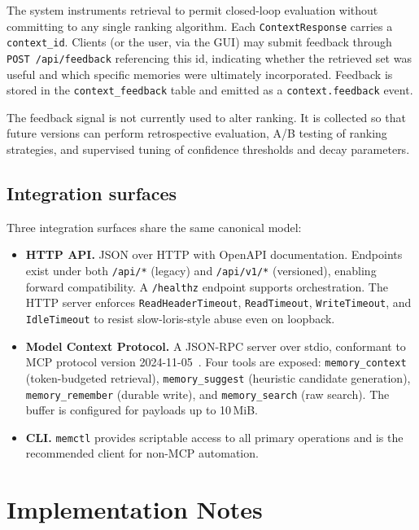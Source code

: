 \documentclass[11pt,a4paper]{article}
\begin{document}
The system instruments retrieval to permit closed-loop evaluation without committing to any single ranking algorithm. Each \texttt{ContextResponse} carries a \texttt{context\_id}. Clients (or the user, via the GUI) may submit feedback through \texttt{POST /api/feedback} referencing this id, indicating whether the retrieved set was useful and which specific memories were ultimately incorporated. Feedback is stored in the \texttt{context\_feedback} table and emitted as a \texttt{context.feedback} event.

The feedback signal is not currently used to alter ranking. It is collected so that future versions can perform retrospective evaluation, A/B testing of ranking strategies, and supervised tuning of confidence thresholds and decay parameters.

\subsection{Integration surfaces}

Three integration surfaces share the same canonical model:

\begin{itemize}
 \item \textbf{HTTP API.} JSON over HTTP with OpenAPI documentation. Endpoints exist under both \texttt{/api/*} (legacy) and \texttt{/api/v1/*} (versioned), enabling forward compatibility. A \texttt{/healthz} endpoint supports orchestration. The HTTP server enforces \texttt{ReadHeaderTimeout}, \texttt{ReadTimeout}, \texttt{WriteTimeout}, and \texttt{IdleTimeout} to resist slow-loris-style abuse even on loopback.
 \item \textbf{Model Context Protocol.} A JSON-RPC server over stdio, conformant to MCP protocol version 2024-11-05~\cite{mcpspec}. Four tools are exposed: \texttt{memory\_context} (token-budgeted retrieval), \texttt{memory\_suggest} (heuristic candidate generation), \texttt{memory\_remember} (durable write), and \texttt{memory\_search} (raw search). The buffer is configured for payloads up to 10\,MiB.
 \item \textbf{CLI.} \texttt{memctl} provides scriptable access to all primary operations and is the recommended client for non-MCP automation.
\end{itemize}

\section{Implementation Notes}
\end{document}
